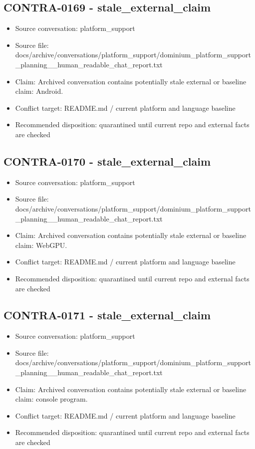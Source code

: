 \documentclass[11pt,a4paper]{report}
\begin{document}
\subsection{CONTRA-0169 - stale\_external\_claim}

\begin{itemize}
\item Source conversation: platform\_support
\item Source file: docs/archive/conversations/platform\_support/dominium\_platform\_support\_planning\_\_human\_readable\_chat\_report.txt
\item Claim: Archived conversation contains potentially stale external or baseline claim: Android.
\item Conflict target: README.md / current platform and language baseline
\item Recommended disposition: quarantined until current repo and external facts are checked
\end{itemize}

\subsection{CONTRA-0170 - stale\_external\_claim}

\begin{itemize}
\item Source conversation: platform\_support
\item Source file: docs/archive/conversations/platform\_support/dominium\_platform\_support\_planning\_\_human\_readable\_chat\_report.txt
\item Claim: Archived conversation contains potentially stale external or baseline claim: WebGPU.
\item Conflict target: README.md / current platform and language baseline
\item Recommended disposition: quarantined until current repo and external facts are checked
\end{itemize}

\subsection{CONTRA-0171 - stale\_external\_claim}

\begin{itemize}
\item Source conversation: platform\_support
\item Source file: docs/archive/conversations/platform\_support/dominium\_platform\_support\_planning\_\_human\_readable\_chat\_report.txt
\item Claim: Archived conversation contains potentially stale external or baseline claim: console program.
\item Conflict target: README.md / current platform and language baseline
\item Recommended disposition: quarantined until current repo and external facts are checked
\end{itemize}
\end{document}
